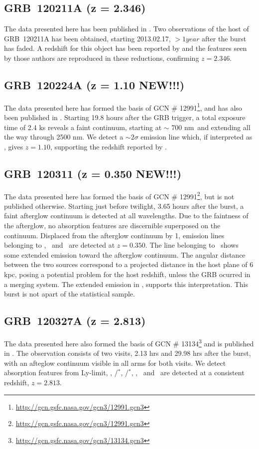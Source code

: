 \documentclass{aa}    %
\begin{document}
\subsection{GRB~120211A (z = 2.346)}
The data presented here has been published in \citet{Kruhler2015}. Two
observations of the host of GRB~120211A has been obtained, starting 2013.02.17,
$> 1 year$ after the burst has faded. A redshift for this object has been
reported by \citet{Kruhler2015} and the features seen by those authors are
reproduced in these reductions, confirming $z =	2.346$.

\subsection{GRB~120224A (z = 1.10 NEW!!!)}
The data presented here has formed the basis of GCN \#
12991\footnote{\url{http://gcn.gsfc.nasa.gov/gcn3/12991.gcn3}}, and has also
been published in \citet{Kruhler2015}. Starting 19.8 hours after the GRB
trigger, a total exposure time of 2.4 ks reveals a faint continuum, starting at
$\sim$ 700 nm~and extending all the way through 2500 nm. We detect a $\sim
2 \sigma$ emission line which, if interpreted as \ha, gives $z = 1.10$,
supporting the redshift reported by \citet{Kruhler2015}.

\subsection{GRB~120311 (z = 0.350 NEW!!!)}
The data presented here has formed the basis of GCN \#
12991\footnote{\url{http://gcn.gsfc.nasa.gov/gcn3/12991.gcn3}}, but is not
published otherwise. Starting just before twilight, 3.65 hours after the burst,
a faint afterglow continuum is detected at all wavelengths. Due to the
faintness of the afterglow, no absorption features are discernible superposed
on the continuum. Displaced from the afterglow continuum by 1, emission
lines belonging to \hb, \oiii~and \ha~are detected at $z = 0.350$. The line
belonging to \ha~shows some extended emission toward the afterglow continuum.
The angular distance between the two sources correspond to a projected distance
in the host plane of 6 kpc, posing a potential problem for the host redshift,
unless the GRB ocurred in a merging system. The extended emission in \ha,
supports this interpretation. This burst is not apart of the statistical sample.

\subsection{GRB~120327A (z = 2.813)}
The data presented here also formed the basis of GCN \#
13134\footnote{\url{http://gcn.gsfc.nasa.gov/gcn3/13134.gcn3}} and is published
in \citet{DElia2014}. The observation consists of two visits, 2.13 hrs and
29.98 hrs after the burst, with an afteglow continuum visible in all arms for
both visits. We detect absorption features from Ly-limit, \lya, \cii/\cii$^*$,
\SIii/\SIii$^*$, \ali, \feii ~and \mgii ~are detected at a consistent redshift,
$z = 2.813$.
\end{document}
